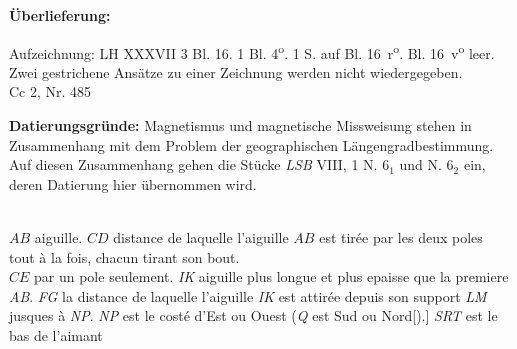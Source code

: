 \begin{ledgroupsized}[r]{120mm}
\footnotesize
\pstart
\noindent
\textbf{\"{U}berlieferung:}
\pend
\end{ledgroupsized}
\begin{ledgroupsized}[r]{114mm}
\footnotesize
\pstart
\parindent -6mm
%
Aufzeichnung: LH XXXVII 3 Bl. 16. 1 Bl. 4\textsuperscript{o}.
1 S. auf Bl. 16~r\textsuperscript{o}. Bl. 16~v\textsuperscript{o} leer.
Zwei gestrichene Ansätze zu einer Zeichnung werden nicht wiedergegeben.\\%
Cc 2, Nr. 485
\pend
\end{ledgroupsized}
\vspace*{4mm}
\begin{ledgroup}
\footnotesize
\pstart
\noindent
\footnotesize{\textbf{Datierungsgr\"{u}nde:} Magnetismus und magnetische Missweisung stehen in Zusammenhang mit dem Problem der geographischen Längengradbestimmung. Auf diesen Zusammenhang gehen die Stücke \cite{01072}\textit{LSB} VIII, 1 N. $6_1$ und N. $6_2$ ein,
deren Datierung hier übernommen wird.}
\pend
\count{}
\count{}
\count{}
\end{ledgroup}
\vspace*{4mm}
\pstart%
\normalsize%
\noindent%
[16~r\textsuperscript{o}]\\
$AB$ aiguille.
\pend
\pstart%
\noindent%
$CD$ distance de laquelle 
l'aiguille\protect{} $AB$ est tirée
\hspace{2mm}
par les deux poles tout à la fois,
\pend
\pstart\noindent
\hspace{74mm} chacun tirant son bout. \\
$CE$ 
\hspace{9mm}par un pole seulement.
\pend
\pstart%
\noindent%
\textit{IK} aiguille plus longue et plus epaisse que la premiere \textit{AB}.
\newline%
\textit{FG} la distance de laquelle l'aiguille \textit{IK} est attir\'{e}e depuis son support \textit{LM} jusques à \textit{NP}.
\newline%
\textit{NP} est le cost\'{e} d'Est ou Ouest  (\textit{Q}  est Sud ou Nord[).]
\newline%
\textit{SRT} est le bas de l'aimant\protect{}
